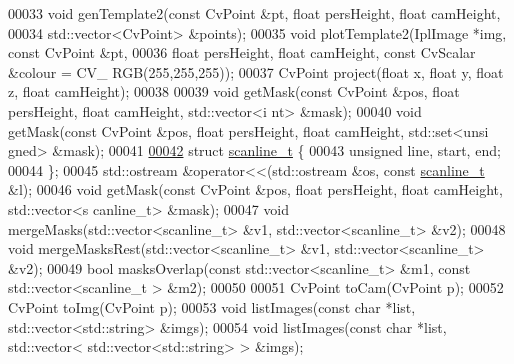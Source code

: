 \begin{DoxyCode}
00033 \textcolor{keywordtype}{void} genTemplate2(\textcolor{keyword}{const} CvPoint &pt, \textcolor{keywordtype}{float} persHeight, \textcolor{keywordtype}{float} camHeight,
00034                  std::vector<CvPoint> &points);
00035 \textcolor{keywordtype}{void} plotTemplate2(IplImage *img, \textcolor{keyword}{const} CvPoint &pt,
00036                   \textcolor{keywordtype}{float} persHeight, \textcolor{keywordtype}{float} camHeight, \textcolor{keyword}{const} CvScalar &colour = CV\_
      RGB(255,255,255));
00037 CvPoint project(\textcolor{keywordtype}{float} x, \textcolor{keywordtype}{float} y, \textcolor{keywordtype}{float} z, \textcolor{keywordtype}{float} camHeight);
00038 
00039 \textcolor{keywordtype}{void} getMask(\textcolor{keyword}{const} CvPoint &pos, \textcolor{keywordtype}{float} persHeight, \textcolor{keywordtype}{float} camHeight, std::vector<i
      nt> &mask);
00040 \textcolor{keywordtype}{void} getMask(\textcolor{keyword}{const} CvPoint &pos, \textcolor{keywordtype}{float} persHeight, \textcolor{keywordtype}{float} camHeight, std::set<unsi
      gned> &mask);
00041 
\hypertarget{Helpers_8hh_source_l00042}{}\hyperlink{structscanline__t}{00042} \textcolor{keyword}{struct }\hyperlink{structscanline__t}{scanline_t} \{
00043      \textcolor{keywordtype}{unsigned} line, start, end;
00044 \};
00045 std::ostream &operator<<(std::ostream &os, \textcolor{keyword}{const} \hyperlink{structscanline__t}{scanline_t} &l);
00046 \textcolor{keywordtype}{void} getMask(\textcolor{keyword}{const} CvPoint &pos, \textcolor{keywordtype}{float} persHeight, \textcolor{keywordtype}{float} camHeight, std::vector<s
      canline\_t> &mask);
00047 \textcolor{keywordtype}{void} mergeMasks(std::vector<scanline\_t> &v1, std::vector<scanline\_t> &v2);
00048 \textcolor{keywordtype}{void} mergeMasksRest(std::vector<scanline\_t> &v1, std::vector<scanline\_t> &v2);
00049 \textcolor{keywordtype}{bool} masksOverlap(\textcolor{keyword}{const} std::vector<scanline\_t> &m1, \textcolor{keyword}{const} std::vector<scanline\_t
      > &m2);
00050 
00051 CvPoint toCam(CvPoint p);
00052 CvPoint toImg(CvPoint p);
00053 \textcolor{keywordtype}{void} listImages(\textcolor{keyword}{const} \textcolor{keywordtype}{char} *list, std::vector<std::string> &imgs);
00054 \textcolor{keywordtype}{void} listImages(\textcolor{keyword}{const} \textcolor{keywordtype}{char} *list, std::vector< std::vector<std::string> > &imgs);
      

\end{DoxyCode}
